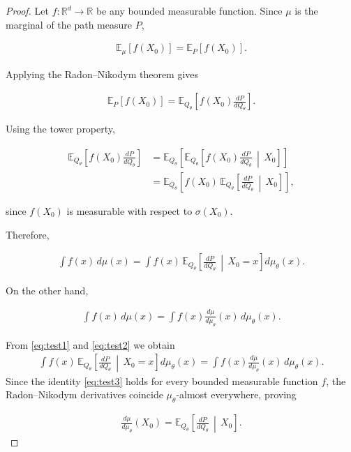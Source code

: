 \documentclass[11pt]{article}
\begin{document}
\begin{proof}

Let $f:\mathbb R^d\rightarrow\mathbb R$ be any bounded measurable function.
Since $\mu$ is the marginal of the path measure $P$,

\begin{align}
\mathbb E_\mu[f(X_0)]
=
\mathbb E_P[f(X_0)].
\end{align}

Applying the Radon--Nikodym theorem gives

\begin{align}
\mathbb E_P[f(X_0)]
=
\mathbb E_{Q_\theta}
\left[
f(X_0)
\frac{dP}{dQ_\theta}
\right].
\end{align}

Using the tower property,

\begin{align}
\mathbb E_{Q_\theta}
\left[
f(X_0)
\frac{dP}{dQ_\theta}
\right]
&=
\mathbb E_{Q_\theta}
\left[
\mathbb E_{Q_\theta}
\left[
f(X_0)
\frac{dP}{dQ_\theta}
\,\middle|\,
X_0
\right]
\right]
\nonumber \\ 
&=
\mathbb E_{Q_\theta}
\left[
f(X_0)
\,
\mathbb E_{Q_\theta}
\left[
\frac{dP}{dQ_\theta}
\,\middle|\,
X_0
\right]
\right],
\end{align}


since $f(X_0)$ is measurable with respect to $\sigma(X_0)$.

Therefore,

\begin{align}
\int
f(x)
\,d\mu(x)
=
\int
f(x)
\,
\mathbb E_{Q_\theta}
\left[
\frac{dP}{dQ_\theta}
\,\middle|\,
X_0=x
\right]
d\mu_\theta(x). \label{eq:test1}
\end{align}

On the other hand,

\begin{align}
\int
f(x)
\,d\mu(x)
=
\int
f(x)
\frac{d\mu}{d\mu_\theta}(x)
\,d\mu_\theta(x). \label{eq:test2}
\end{align}

From \eqref{eq:test1} and \eqref{eq:test2} we obtain
\begin{align}
\int
f(x)
\,
\mathbb E_{Q_\theta}
\left[
\frac{dP}{dQ_\theta}
\,\middle|\,
X_0=x
\right]
d\mu_\theta(x) = \int
f(x)
\frac{d\mu}{d\mu_\theta}(x)
\,d\mu_\theta(x) \label{eq:test3}.
\end{align}
Since the identity \eqref{eq:test3} holds for every bounded measurable function $f$, the
Radon--Nikodym derivatives coincide $\mu_\theta$-almost everywhere, proving

\begin{align}
\frac{d\mu}{d\mu_\theta}(X_0)
=
\mathbb E_{Q_\theta}
\left[
\frac{dP}{dQ_\theta}
\,\middle|\,
X_0
\right].
\end{align}

\end{proof}
\end{document}
